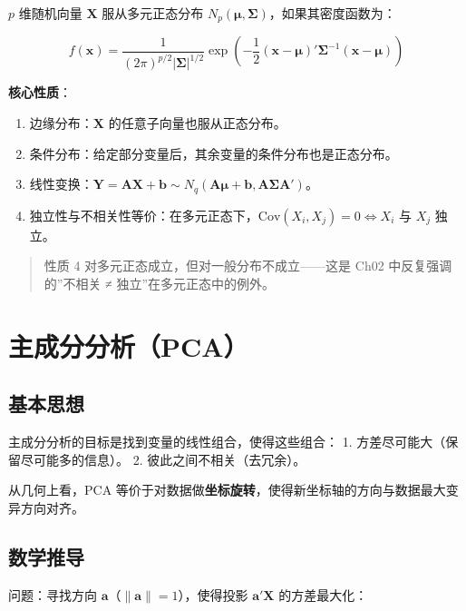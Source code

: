 \documentclass[
]{book}
\providecommand{\tightlist}{%
  \setlength{\itemsep}{0pt}\setlength{\parskip}{0pt}}
\begin{document}
\(p\) 维随机向量 \(\mathbf{X}\) 服从多元正态分布 \(N_p(\boldsymbol{\mu}, \boldsymbol{\Sigma})\)，如果其密度函数为：

\[f(\mathbf{x}) = \frac{1}{(2\pi)^{p/2} |\boldsymbol{\Sigma}|^{1/2}} \exp\left(-\frac{1}{2} (\mathbf{x} - \boldsymbol{\mu})' \boldsymbol{\Sigma}^{-1} (\mathbf{x} - \boldsymbol{\mu})\right)\]

\textbf{核心性质}：

\begin{enumerate}
\def\labelenumi{\arabic{enumi}.}
\tightlist
\item
  边缘分布：\(\mathbf{X}\) 的任意子向量也服从正态分布。
\item
  条件分布：给定部分变量后，其余变量的条件分布也是正态分布。
\item
  线性变换：\(\mathbf{Y} = \mathbf{A}\mathbf{X} + \mathbf{b} \sim N_q(\mathbf{A}\boldsymbol{\mu} + \mathbf{b}, \mathbf{A}\boldsymbol{\Sigma}\mathbf{A}')\)。
\item
  独立性与不相关性等价：在多元正态下，\(\text{Cov}(X_i, X_j) = 0 \Leftrightarrow X_i\) 与 \(X_j\) 独立。
\end{enumerate}

\begin{quote}
性质 4 对多元正态成立，但对一般分布不成立------这是 Ch02 中反复强调的''不相关 ≠ 独立''在多元正态中的例外。
\end{quote}

\section{主成分分析（PCA）}\label{ux4e3bux6210ux5206ux5206ux6790pca}

\subsection{基本思想}\label{ux57faux672cux601dux60f3}

主成分分析的目标是找到变量的线性组合，使得这些组合：
1. 方差尽可能大（保留尽可能多的信息）。
2. 彼此之间不相关（去冗余）。

从几何上看，PCA 等价于对数据做\textbf{坐标旋转}，使得新坐标轴的方向与数据最大变异方向对齐。

\subsection{数学推导}\label{ux6570ux5b66ux63a8ux5bfc}

问题：寻找方向 \(\mathbf{a}\)（\(\|\mathbf{a}\| = 1\)），使得投影 \(\mathbf{a}'\mathbf{X}\) 的方差最大化：
\end{document}
